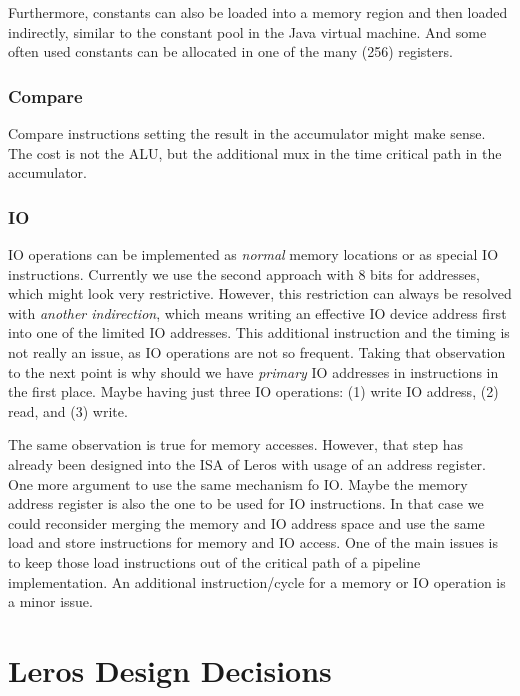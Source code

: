 \documentclass[a4paper,fontsize=10pt,twoside,DIV15,BCOR12mm,headinclude=true,footinclude=false,pagesize,bibtotoc]{scrbook}
\begin{document}
Furthermore, constants can also be loaded into a memory region and then loaded indirectly,
similar to the constant pool in the Java virtual machine. And some often used constants can
be allocated in one of the many (256) registers.

\subsection{Compare}

Compare instructions setting the result in the accumulator might make sense. The cost is not
the ALU, but the additional mux in the time critical path in the accumulator.

\subsection{IO}

IO operations can be implemented as \emph{normal} memory locations or as special IO instructions.
Currently we use the second approach with 8 bits for addresses, which might look very restrictive.
However, this restriction can always be resolved with \emph{another indirection}, which means writing
an effective IO device address first into one of the limited IO addresses. This additional instruction and
the timing is not really an issue, as IO operations are not so frequent.
Taking that observation to the next point is why should we have \emph{primary} IO addresses in
instructions in the first place. Maybe having just three IO operations: (1) write IO address, (2) read,
and (3) write.

The same observation is true for memory accesses. However, that step has already been designed
into the ISA of Leros with usage of an address register. One more argument to use the same mechanism
fo IO. Maybe the memory address register is also the one to be used for IO instructions.
In that case we could reconsider merging the memory and IO address space and use the same
load and store instructions for memory and IO access. One of the main issues is to keep those
load instructions out of the critical path of a pipeline implementation. An additional instruction/cycle
for a memory or IO operation is a minor issue.



\chapter{Leros Design Decisions}
\label{sec:design}
\end{document}
